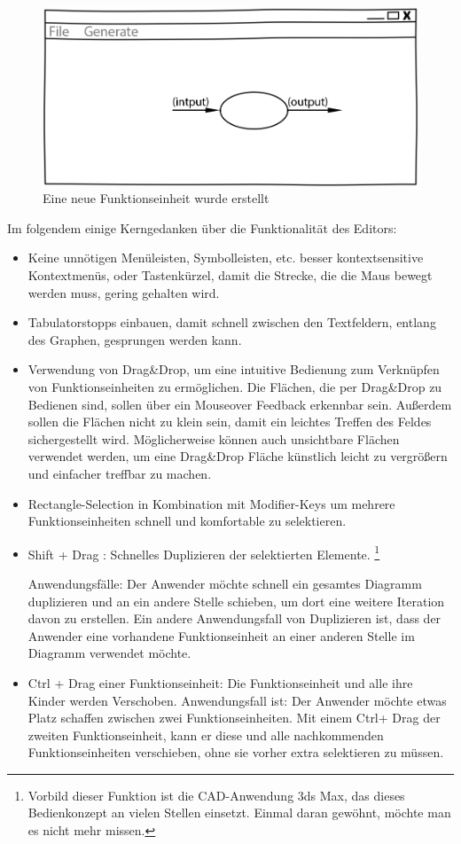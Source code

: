 \begin{figure}[H]
	\centering
\includegraphics[width=.9\linewidth]{./img/NewCell.jpg}
	\caption{Eine neue Funktionseinheit wurde erstellt}
\end{figure}




\bigskip
Im folgendem einige Kerngedanken über die Funktionalität des Editors:

\begin{itemize}
\item Keine unnötigen Menüleisten, Symbolleisten, etc. besser kontextsensitive
Kontextmenüs, oder Tastenkürzel,  damit die Strecke, die die Maus bewegt werden muss, gering
gehalten wird.
\item Tabulatorstopps einbauen, damit schnell zwischen den Textfeldern, entlang des
Graphen, gesprungen werden kann.
\item Verwendung von Drag\&Drop, um eine intuitive Bedienung zum Verknüpfen von
Funktionseinheiten zu ermöglichen. Die Flächen, die per Drag\&Drop zu Bedienen
sind, sollen über ein Mouseover Feedback erkennbar sein. Außerdem sollen die
Flächen nicht zu klein sein, damit ein leichtes Treffen des Feldes
sichergestellt wird. Möglicherweise können auch unsichtbare Flächen verwendet
werden, um eine Drag\&Drop Fläche künstlich leicht zu vergrößern und einfacher treffbar zu machen.
\item Rectangle-Selection in Kombination mit Modifier-Keys um mehrere Funktionseinheiten
schnell und komfortable zu selektieren.
\item Shift + Drag : Schnelles Duplizieren der selektierten Elemente. 
\footnote{Vorbild dieser Funktion ist die CAD-Anwendung 3ds Max, das dieses Bedienkonzept an vielen Stellen einsetzt.
Einmal daran gewöhnt, möchte man es nicht mehr missen.} 

Anwendungsfälle:
Der Anwender möchte  schnell ein gesamtes Diagramm duplizieren und an ein andere Stelle schieben, um dort eine weitere Iteration davon zu erstellen.
Ein andere Anwendungsfall von Duplizieren ist, dass der Anwender eine vorhandene
Funktionseinheit an einer anderen Stelle im Diagramm verwendet möchte. 

\item Ctrl + Drag einer Funktionseinheit: Die Funktionseinheit und alle ihre Kinder werden
Verschoben. Anwendungsfall ist: Der Anwender möchte etwas Platz schaffen
zwischen zwei Funktionseinheiten. Mit einem Ctrl+ Drag der zweiten Funktionseinheit,
kann er diese und alle nachkommenden Funktionseinheiten verschieben, ohne sie
vorher extra selektieren zu müssen.
\end{itemize}

